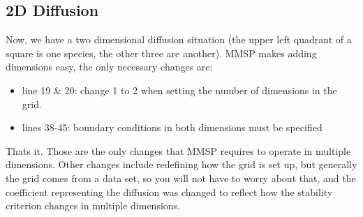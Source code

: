 \documentclass{article}
\begin{document}
\subsection{2D Diffusion}
Now, we have a two dimensional diffusion situation (the upper left quadrant of a square is one species, the other three are another). MMSP makes adding dimensions easy, the only necessary changes are:
\begin{itemize} \itemsep1pt \parskip0pt 
\item line 19 \& 20: change 1 to 2 when setting the number of dimensions in the grid. 
\item lines 38-45: boundary conditions in both dimensions must be specified
\end{itemize}
Thats it.  Those are the only changes that MMSP requires to operate in multiple dimensions.  Other changes include redefining how the grid is set up, but generally the grid comes from a data set, so you will not have to worry about that, and the coefficient representing the diffusion was changed to reflect how the stability criterion changes in multiple dimensions.
\end{document}
